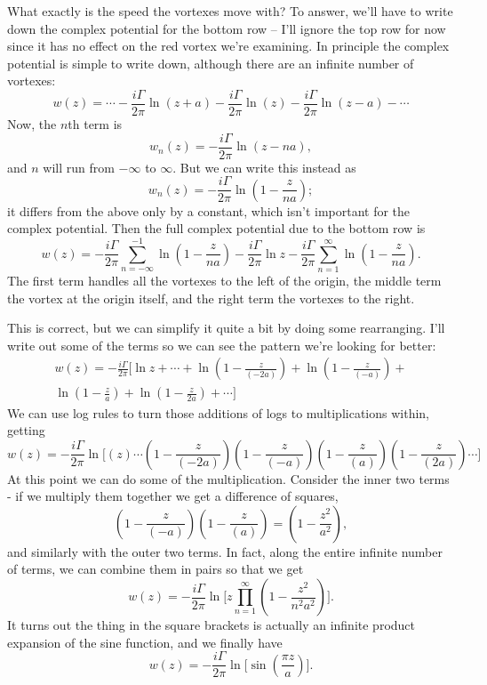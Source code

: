 What exactly is the speed the vortexes move with?  To answer, we'll have to write down the complex potential for the bottom row -- I'll ignore the top row for now since it has no effect on the red vortex we're examining.  In principle the complex potential is simple to write down, although there are an infinite number of vortexes:
\[
w(z) = \cdots - \frac{i\Gamma}{2\pi} \ln (z + a) - \frac{i\Gamma}{2\pi} \ln (z) - \frac{i\Gamma}{2\pi} \ln (z - a) - \cdots
\]
Now, the $n$th term is
\[
w_n(z) = -\frac{i\Gamma}{2\pi} \ln (z - na),
\]
and $n$ will run from $-\infty$ to $\infty$.  But we can write this instead as
\[
w_n(z) = -\frac{i\Gamma}{2\pi} \ln \left(1 - \frac{z}{na} \right);
\]
it differs from the above only by a constant, which isn't important for the complex potential.  Then the full complex potential due to the bottom row is
\begin{equation}
w(z) = -\frac{i\Gamma}{2\pi} \sum_{n=-\infty}^{-1} \ln \left(1 - \frac{z}{na} \right) - \frac{i\Gamma}{2\pi} \ln z -\frac{i\Gamma}{2\pi} \sum_{n=1}^{\infty} \ln \left(1 - \frac{z}{na} \right).
\end{equation}
The first term handles all the vortexes to the left of the origin, the middle term the vortex at the origin itself, and the right term the vortexes to the right.  

This is correct, but we can simplify it quite a bit by doing some rearranging.  I'll write out some of the terms so we can see the pattern we're looking for better:
\begin{multline*}
w(z) = -\frac{i\Gamma}{2\pi} \biggl[ \ln z + \cdots + \ln \left(1 - \frac{z}{(-2a)} \right) +  \ln \left(1 - \frac{z}{(-a)} \right) + \\ \ln \left(1 - \frac{z}{a} \right) +  \ln \left(1 - \frac{z}{2a} \right) + \cdots \biggr]
\end{multline*}
We can use log rules to turn those additions of logs to multiplications within, getting
\[
w(z) = -\frac{i\Gamma}{2\pi} \ln \biggl[ (z) \cdots \left(1 - \frac{z}{(-2a)} \right) \left(1 - \frac{z}{(-a)} \right) \left(1 - \frac{z}{(a)} \right) \left(1 - \frac{z}{(2a)} \right) \cdots \biggr]
\]
At this point we can do some of the multiplication.  Consider the inner two terms - if we multiply them together we get a difference of squares,
\[
\left(1 - \frac{z}{(-a)} \right) \left(1 - \frac{z}{(a)} \right) = \left( 1 - \frac{z^2}{a^2} \right),
\]
and similarly with the outer two terms.  In fact, along the entire infinite number of terms, we can combine them in pairs so that we get
\[
w(z) = -\frac{i\Gamma}{2\pi} \ln \biggl[ z \prod_{n=1}^\infty \left( 1- \frac{z^2}{n^2 a^2} \right) \biggr].
\]
It turns out the thing in the square brackets is actually an infinite product expansion of the sine function, and we finally have 
\begin{equation}
\label{eq_vortex_street}
w(z) = -\frac{i\Gamma}{2\pi}\ln \biggl[ \sin \left( \frac{\pi z}{a} \right) \biggr].
\end{equation}

